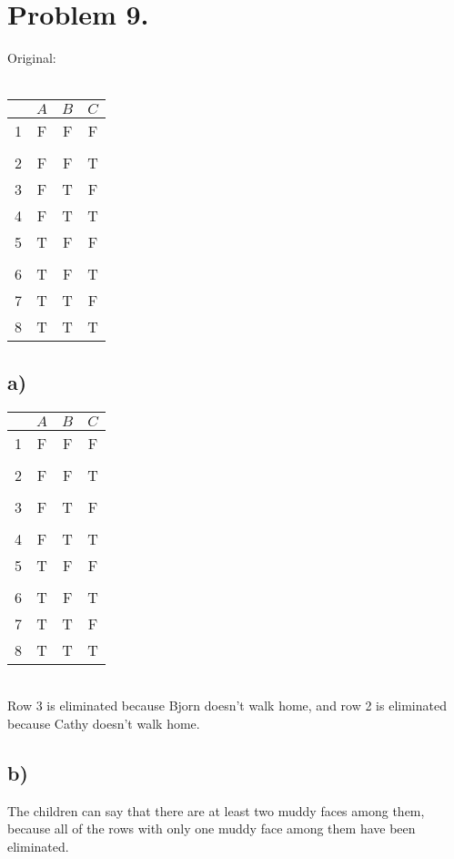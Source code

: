 \documentclass{article}
\begin{document}
\section*{Problem 9.}
Original:\\ \\
\begin{tabular}{c | c | c | c |}
    & $A$ & $B$ & $C$ \\ \hline
    1 & F & F & F \\ [-1.75ex] \hline \\ [-1.2ex] \hline
    2 & F & F & T \\ \hline
    3 & F & T & F \\ \hline
    4 & F & T & T \\ \hline
    5 & T & F & F \\ [-1.75ex] \hline \\ [-1.2ex] \hline
    6 & T & F & T \\ \hline
    7 & T & T & F \\ \hline
    8 & T & T & T \\
\end{tabular}
\subsection*{a)}
\begin{tabular}{c | c | c | c |}
    & $A$ & $B$ & $C$ \\ \hline
    1 & F & F & F \\ [-1.75ex] \hline \\ [-1.2ex] \hline
    2 & F & F & T \\ [-1.75ex] \hline \\ [-1.2ex] \hline
    3 & F & T & F \\ [-1.75ex] \hline \\ [-1.2ex] \hline
    4 & F & T & T \\ \hline
    5 & T & F & F \\ [-1.75ex] \hline \\ [-1.2ex] \hline
    6 & T & F & T \\ \hline
    7 & T & T & F \\ \hline
    8 & T & T & T \\
\end{tabular}\\
Row 3 is eliminated because Bjorn doesn't walk home, and row 2 is eliminated because Cathy doesn't walk home.\\
\subsection*{b)}
The children can say that there are at least two muddy faces among them, because all of the rows with only one muddy face among them have been eliminated.\\
\end{document}
